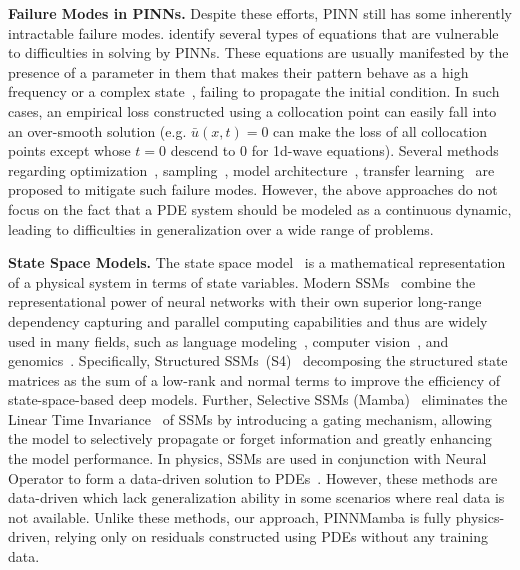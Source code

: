 \documentclass{article}
\theoremstyle{plain}
\theoremstyle{definition}
\theoremstyle{remark}
\begin{document}
\textbf{Failure Modes in PINNs.}
Despite these efforts, PINN still has some inherently intractable failure modes. 
\citet{krishnapriyan2021characterizing} identify several types of equations that are vulnerable to difficulties in solving by PINNs.  
    These equations are usually manifested by the presence of a parameter in them that makes their pattern behave as a high frequency or a complex state~\cite{pmlr-v235-cho24b}, failing to propagate the initial condition. 
        In such cases, an empirical loss constructed using a collocation point can easily fall into an over-smooth solution (e.g. $\bar u(x,t)=0$ can make the loss of all collocation points except whose $t=0$ descend to 0 for 1d-wave equations). Several methods regarding optimization~\cite{wu2024ropinn,wang20222}, sampling~\cite{gao2023failure,wu2023comprehensive}, model architecture~\cite{zhao2024pinnsformer,pmlr-v235-cho24b,pmlr-v235-nguyen24c}, transfer learning~\cite{xu2023transfer,pmlr-v235-cho24b} are proposed to mitigate such failure modes. 
            However, the above approaches do not focus on the fact that a PDE system should be modeled as a continuous dynamic, leading to difficulties in generalization over a wide range of problems.




\textbf{State Space Models.} The state space model~\cite{kalman1960new} is a mathematical representation of a physical system in terms of state variables. 
    Modern SSMs~\cite{gu2022efficiently,smith2023simplified,gu2023mamba} combine the representational power of neural networks with their own superior long-range dependency capturing and parallel computing capabilities and thus are widely used in many fields, such as language modeling~\cite{fu2023hungry,poli2023hyena,gu2023mamba,pmlr-v235-dao24a}, computer vision~\cite{pmlr-v235-zhu24f,liu2024vmamba}, and genomics~\cite{gu2023mamba,nguyen2024sequence}. Specifically, Structured SSMs~(S4)~\cite{gu2022efficiently} decomposing the structured state matrices as the sum of a low-rank
and normal terms to improve the efficiency of state-space-based deep models. Further, Selective SSMs (Mamba)~\cite{gu2023mamba} eliminates the Linear Time Invariance~\cite{sain1969invertibility} of SSMs by introducing a gating mechanism, allowing the model to selectively propagate or forget information and greatly enhancing the model performance. In physics, SSMs are used in conjunction with Neural Operator to form a data-driven solution to PDEs~\cite{zheng2024aliasfree,hu2024state}. 
However, these methods are data-driven which lack generalization ability in some scenarios where real data is not available. Unlike these methods, our approach, PINNMamba is fully physics-driven, relying only on residuals constructed using PDEs without any training data.
\end{document}
